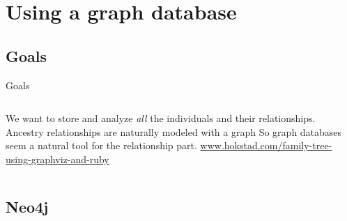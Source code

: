 \documentclass{beamer}
\newcommand{\linespace}{\vskip 0.25cm}
\begin{document}
\section[Using a graph DB]{Using a graph database}

\subsection{Goals}

\begin{frame}{Goals}
	\begin{columns}
		\begin{column}{0.6 \linewidth}
					We want to store and analyze \emph{all} the individuals and their relationships.
					\linespace
					Ancestry relationships are naturally modeled with a graph
					\linespace
					So graph databases seem a natural tool for the relationship part.
					\linespace
					\centering
					\tiny{\url{www.hokstad.com/family-tree-using-graphviz-and-ruby}}
		\end{column}
		\begin{column}{0.4 \linewidth}
			\tiny{\cite{Burlacu:2013:VGL:2464576.2482714}}
		\end{column}		
	\end{columns}
\end{frame}

\subsection{Neo4j}
\end{document}
